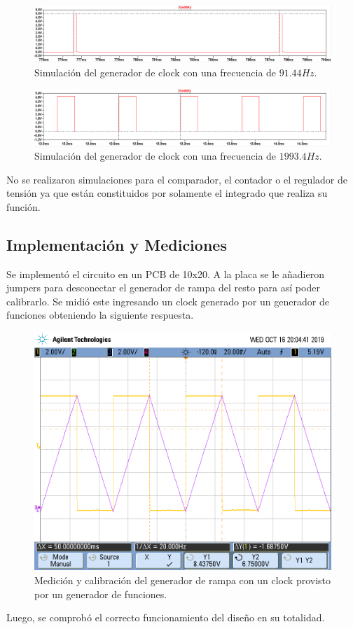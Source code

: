 \begin{figure}[H]
\centering
\includegraphics[width=\textwidth]{Imagenes/clockgen1.png}
\caption{Simulación del generador de clock con una frecuencia de $91.44Hz$.}
\label{sim:gen1}
\end{figure}
\begin{figure}[H]
\centering
\includegraphics[width=\textwidth]{Imagenes/clockgen2.png}
\caption{Simulación del generador de clock con una frecuencia de $1993.4Hz$.}
\label{sim:gen2}
\end{figure}

No se realizaron simulaciones para el comparador, el contador o el regulador de tensión ya que están constituidos por solamente el integrado que realiza su función.

\subsection{Implementación y Mediciones}
Se implementó el circuito en un PCB de 10x20. A la placa se le añadieron jumpers para desconectar el generador de rampa del resto para así poder calibrarlo. Se midió este ingresando un clock generado por un generador de funciones obteniendo la siguiente respuesta.

\begin{figure}[H]
\centering
\includegraphics[width=\textwidth,trim={0 2.2cm 0.1cm 1.75cm},clip]{Imagenes/ramp.png}
\caption{Medición y calibración del generador de rampa con un clock provisto por un generador de funciones.}
\label{med:ramp}
\end{figure}

Luego, se comprobó el correcto funcionamiento del diseño en su totalidad.
